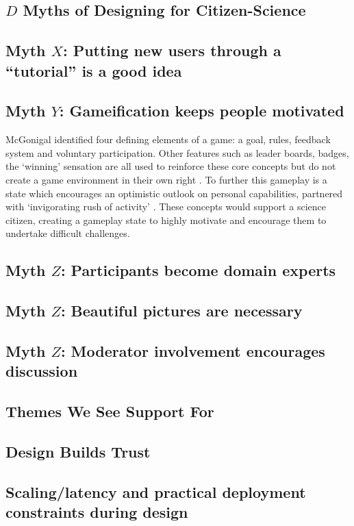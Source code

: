 \documentclass{sigchi}
\begin{document}
\subsection{$D$ Myths of Designing for Citizen-Science}
\subsection{Myth $X$: Putting new users through a ``tutorial'' is a good idea}
\subsection{Myth $Y$: Gameification keeps people motivated}
McGonigal identified four defining elements of a game: a goal, rules, feedback system and voluntary participation. Other features such as leader boards, badges, the `winning' sensation are all used to reinforce these core concepts but do not create a game environment in their own right \cite{mcgonigal2011reality}. To further this gameplay is a state which encourages an optimistic outlook on personal capabilities, partnered with `invigorating rush of activity' \cite{mcgonigal2011reality}. These concepts would support a science citizen, creating a gameplay state to highly motivate and encourage them to undertake difficult challenges. 
\subsection{Myth $Z$: Participants become domain experts}
\subsection{Myth $Z$: Beautiful pictures are necessary}
\subsection{Myth $Z$: Moderator involvement encourages discussion}

\subsection{Themes We See Support For}
\subsection{Design Builds Trust}
\subsection{Scaling/latency and practical deployment constraints during design}
\end{document}

